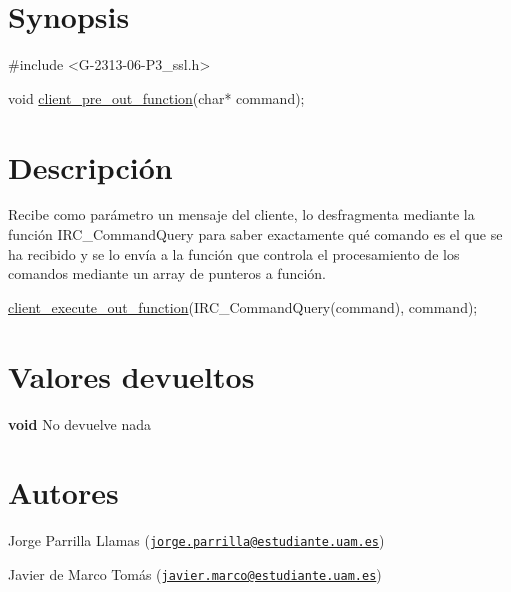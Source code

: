 \hypertarget{client_pre_out_function_synopsis_5}{}\section{Synopsis}\label{client_pre_out_function_synopsis_5}

\begin{DoxyCode}
\textcolor{preprocessor}{#include <G-2313-06-P3\_ssl.h>}

\textcolor{keywordtype}{void} \hyperlink{G-2313-06-P2__client_8h_a68019fe1e0edcc71bb3dadeb70a86dcd}{client\_pre\_out\_function}(\textcolor{keywordtype}{char}* command);
\end{DoxyCode}
 \hypertarget{client_pre_out_function_descripcion_5}{}\section{Descripción}\label{client_pre_out_function_descripcion_5}
Recibe como parámetro un mensaje del cliente, lo desfragmenta mediante la función I\+R\+C\+\_\+\+Command\+Query para saber exactamente qué comando es el que se ha recibido y se lo envía a la función que controla el procesamiento de los comandos mediante un array de punteros a función. 
\begin{DoxyCode}
\hyperlink{G-2313-06-P2__client_8h_a26512d35b24fec46c8fa4c803dc00867}{client\_execute\_out\_function}(IRC\_CommandQuery(command), command);
\end{DoxyCode}
\hypertarget{client_pre_out_function_return_5}{}\section{Valores devueltos}\label{client_pre_out_function_return_5}

\begin{DoxyItemize}
\item {\bfseries void} No devuelve nada 
\end{DoxyItemize}\hypertarget{client_pre_out_function_authors_5}{}\section{Autores}\label{client_pre_out_function_authors_5}

\begin{DoxyItemize}
\item Jorge Parrilla Llamas (\href{mailto:jorge.parrilla@estudiante.uam.es}{\tt jorge.\+parrilla@estudiante.\+uam.\+es}) 
\item Javier de Marco Tomás (\href{mailto:javier.marco@estudiante.uam.es}{\tt javier.\+marco@estudiante.\+uam.\+es}) 
\end{DoxyItemize}
